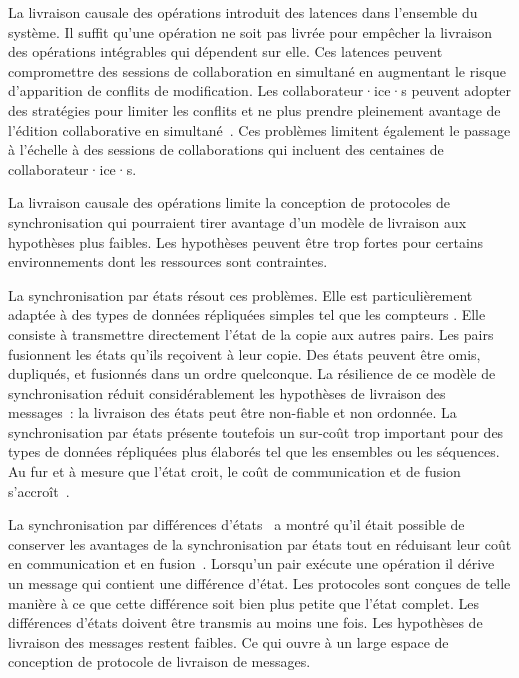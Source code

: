 La livraison causale des opérations introduit des latences dans l'ensemble du système.
Il suffit qu'une opération ne soit pas livrée pour empêcher la livraison des opérations intégrables qui dépendent sur elle.
Ces latences peuvent compromettre des sessions de collaboration en simultané en augmentant le risque d'apparition de conflits de modification.
Les collaborateur·ice·s peuvent adopter des stratégies pour limiter les conflits et ne plus prendre pleinement avantage de l'édition collaborative en simultané~\autocite{ignat2014_delayeffect}.
Ces problèmes limitent également le passage à l'échelle à des sessions de collaborations qui incluent des centaines de collaborateur·ice·s.

La livraison causale des opérations limite la conception de protocoles de synchronisation qui pourraient tirer avantage d'un modèle de livraison aux hypothèses plus faibles.
Les hypothèses peuvent être trop fortes pour certains environnements dont les ressources sont contraintes.

La synchronisation par états résout ces problèmes.
Elle est particulièrement adaptée à des types de données répliquées simples tel que les compteurs \autocite{almeida_2018_delta-crdt-revisited}.
Elle consiste à transmettre directement l'état de la copie aux autres pairs.
Les pairs fusionnent les états qu'ils reçoivent à leur copie.
Des états peuvent être omis, dupliqués, et fusionnés dans un ordre quelconque.
La résilience de ce modèle de synchronisation réduit considérablement les hypothèses de livraison des messages~: la livraison des états peut être non-fiable et non ordonnée.
La synchronisation par états présente toutefois un sur-coût trop important pour des types de données répliquées plus élaborés tel que les ensembles ou les séquences.
Au fur et à mesure que l'état croit, le coût de communication et de fusion s'accroît~\autocite{enes_2018_efficient-sync-state-based-crdt}.

La synchronisation par différences d'états~\autocite{almeida_2018_delta-crdt-revisited} a montré qu'il était possible de conserver les avantages de la synchronisation par états tout en réduisant leur coût en communication et en fusion~\autocite{enes_2018_efficient-sync-state-based-crdt}.
Lorsqu'un pair exécute une opération il dérive un message qui contient une différence d'état.
Les protocoles sont conçues de telle manière à ce que cette différence soit bien plus petite que l'état complet.
Les différences d'états doivent être transmis au moins une fois.
Les hypothèses de livraison des messages restent faibles.
Ce qui ouvre à un large espace de conception de protocole de livraison de messages.

